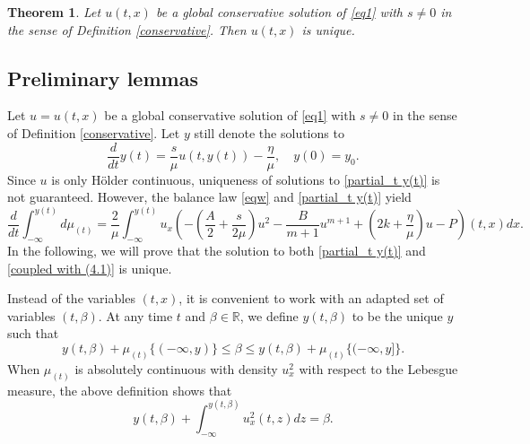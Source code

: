 \documentclass[10pt]{article}
\newtheorem{theo}{Theorem}[section]
\numberwithin{equation}{section}
\begin{document}
	\begin{theo}\label{thm_uniqueness}
		Let $u(t,x)$ be a global conservative solution of \eqref{eq1} with $s\neq0$ in the sense of Definition \ref{conservative}. Then $u(t,x)$ is unique.
	\end{theo}
	\subsection{Preliminary lemmas}
	Let $u=u(t,x)$ be a global conservative solution of \eqref{eq1} with $s\neq0$ in the sense of Definition \ref{conservative}. Let $y$ still denote the solutions to
	\begin{equation}\label{partial_t y(t)}
		\frac{d}{dt}y(t)=\frac{s}{\mu}u(t,y(t))-\frac{\eta}{\mu},\quad y(0)=y_0.
	\end{equation}
	Since $u$ is only H\"{o}lder continuous, uniqueness of solutions to \eqref{partial_t y(t)} is not guaranteed. However, the balance law \eqref{eqw} and \eqref{partial_t y(t)} yield
	\begin{equation}\label{coupled with (4.1)}
		\frac{d}{dt}\int_{-\infty}^{y(t)}d\mu_{(t)}=\frac{2}{\mu}\int_{-\infty}^{y(t)}u_x\left(-\left(\frac{A}{2}+\frac{s}{2\mu}\right)u^2-\frac{B}{m+1}u^{m+1}+\left(2k+\frac{\eta}{\mu}\right)u-P\right)(t,x) dx.
	\end{equation}
	In the following, we will prove that the solution to both \eqref{partial_t y(t)} and \eqref{coupled with (4.1)} is unique.
	
	Instead of the variables $(t,x)$, it is convenient to work with an adapted set of variables $(t,\beta)$. At any time $t$ and $\beta\in\mathbb{R}$, we define $y(t,\beta)$ to be the unique $y$ such that
	\begin{equation}
		y(t,\beta)+\mu_{(t)}\{(-\infty,y)\}\leq\beta\leq y(t,\beta)+\mu_{(t)}\{(-\infty,y]\}.
	\end{equation}
	When $\mu_{(t)}$ is absolutely continuous with density $u_x^2$ with respect to the Lebesgue measure, the above definition shows that
	\begin{equation}\label{y(t,beta)_absolutely continuous}
		y(t,\beta)+\int_{-\infty}^{y(t,\beta)}u_x^2(t,z)dz=\beta.
	\end{equation}
	
\end{document}
